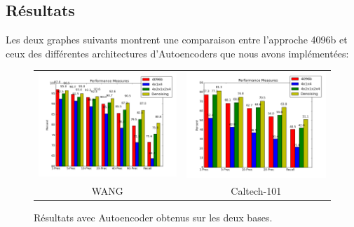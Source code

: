 
\subsection{Résultats}

	Les deux graphes suivants montrent une comparaison entre l'approche 4096b et ceux des différentes architectures d'Autoencoders que nous avons implémentées:

\begin{figure}[H]
\centering
\begin{tabular}{cc}
\centering

\includegraphics[width=9cm]{Figures/results/res-wang2.png}
&
\includegraphics[width=9cm]{Figures/results/res-caltech2.png}\\
WANG & Caltech-101\\
\end{tabular}
\caption[comp7]{Résultats avec Autoencoder obtenus sur les deux bases.}
\end{figure}

